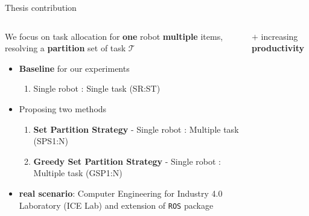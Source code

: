     \begin{frame}[fragile]{Thesis contribution}
        \begin{columns}
            \begin{column}{.7\textwidth}
            We focus on task allocation for {\bf one} robot {\bf multiple} items,            
            resolving a {\bf partition} set of task $\mathcal{T}$
            
            \begin{itemize}
                
                \item {\bf Baseline} for our experiments

                \begin{enumerate}
                    \item Single robot : Single task (SR:ST)
                \end{enumerate}

                \item Proposing two methods
                \begin{enumerate}
                    \item {\bf Set Partition Strategy} - Single robot : Multiple task (SPS1:N)
                    \item {\bf Greedy Set Partition Strategy} - Single robot : Multiple task (GSP1:N)
                \end{enumerate}
                \item {\bf real scenario}: Computer Engineering for Industry 4.0 Laboratory (ICE Lab) and  extension of  \texttt{ROS}  package
            \end{itemize}
            \end{column}
            \begin{column}{.4\textwidth}
                $+$ increasing {\bf productivity}
                

\end{column}
\end{columns}
\end{frame}
